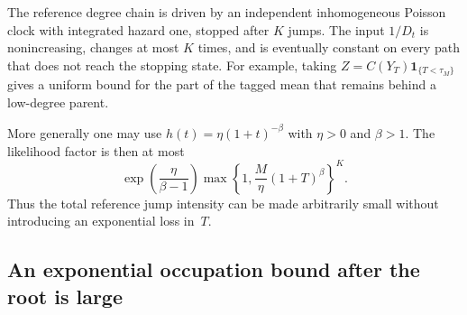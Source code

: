 The reference degree chain is driven by an independent inhomogeneous
Poisson clock with integrated hazard one, stopped after $K$ jumps.
The input $1/D_t$ is nonincreasing, changes at most $K$ times, and is
eventually constant on every path that does not reach the stopping
state.  For example, taking
$Z=C(Y_T)\mathbf1_{\{T<\tau_M\}}$ gives a uniform bound for the part
of the tagged mean that remains behind a low-degree parent.

More generally one may use
$h(t)=\eta(1+t)^{-\beta}$ with $\eta>0$ and $\beta>1$.
The likelihood factor is then at most
\[
 \exp\!\left(\frac{\eta}{\beta-1}\right)
 \max\left\{1,\frac M\eta(1+T)^\beta\right\}^K.
\]
Thus the total reference jump intensity can be made arbitrarily small
without introducing an exponential loss in~$T$.

\subsection{An exponential occupation bound after the root is large}


